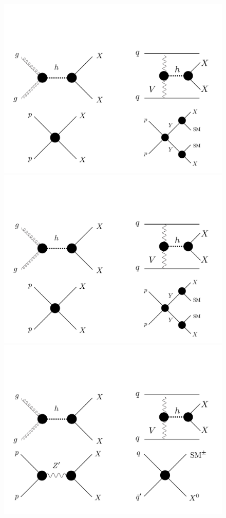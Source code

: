 \begin{figure}[t]
\centerline{\includegraphics[width=\textwidth]{figures/feyndiagram_row1.pdf}}
\vspace{0.8cm}
\centerline{\includegraphics[width=\textwidth]{figures/feyndiagram_row2.pdf}}
\vspace{0.8cm}
\centerline{\includegraphics[width=\textwidth]{figures/feyndiagram_row3.pdf}}

\end{figure}

